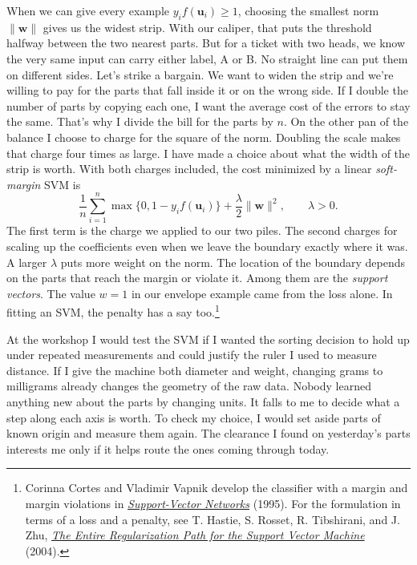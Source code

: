 \documentclass[12pt,oneside]{article}
\newcommand{\bookanchor}[1]{\phantomsection\label{#1}}
\begin{document}
When\bookanchor{topic-06-7} we can give every example $y_i f(\boldsymbol u_i)\geq1$, choosing the smallest norm $\lVert\boldsymbol w\rVert$ gives us the widest strip. With our caliper, that puts the threshold halfway between the two nearest parts. But for a ticket with two heads, we know the very same input can carry either label, A or B. No straight line can put them on different sides. Let's strike a bargain. We want to widen the strip and we're willing to pay for the parts that fall inside it or on the wrong side. If I double the number of parts by copying each one, I want the average cost of the errors to stay the same. That's why I divide the bill for the parts by $n$. On the other pan of the balance I choose to charge for the square of the norm. Doubling the scale makes that charge four times as large. I have made a choice about what the width of the strip is worth. With both charges included, the cost minimized by a linear \emph{soft-margin} SVM is
\[
 \frac1n\sum_{i=1}^n \max\{0,1-y_i f(\boldsymbol u_i)\}
       +\frac{\lambda}{2}\lVert\boldsymbol w\rVert^2,\qquad \lambda>0.
\]
The\bookanchor{topic-06-8} first term is the charge we applied to our two piles. The second charges for scaling up the coefficients even when we leave the boundary exactly where it was. A larger $\lambda$ puts more weight on the norm. The location of the boundary depends on the parts that reach the margin or violate it. Among them are the \emph{support vectors}. The value $w=1$ in our envelope example came from the loss alone. In fitting an SVM, the penalty has a say too.\footnote{Corinna Cortes and Vladimir Vapnik develop the classifier with a margin and margin violations in \href{https://doi.org/10.1007/BF00994018}{\emph{Support-Vector Networks}} (1995). For the formulation in terms of a loss and a penalty, see T. Hastie, S. Rosset, R. Tibshirani, and J. Zhu, \href{https://jmlr.org/papers/v5/hastie04a.html}{\emph{The Entire Regularization Path for the Support Vector Machine}} (2004).}

At the workshop I would test the SVM if I wanted the sorting decision to hold up under repeated measurements and could justify the ruler I used to measure distance. If I give the machine both diameter and weight, changing grams to milligrams already changes the geometry of the raw data. Nobody learned anything new about the parts by changing units. It falls to me to decide what a step along each axis is worth. To check my choice, I would set aside parts of known origin and measure them again. The clearance I found on yesterday's parts interests me only if it helps route the ones coming through today.
\end{document}
